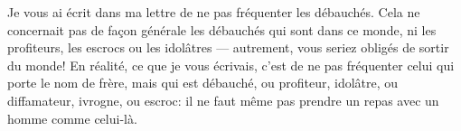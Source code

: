 Je vous ai écrit dans ma lettre de ne pas fréquenter les débauchés.
Cela ne concernait pas de façon générale les débauchés qui sont dans ce monde,
	ni les profiteurs, les escrocs ou les idolâtres
	--- autrement, vous seriez obligés de sortir du monde!
En réalité, ce que je vous écrivais,
	c’est de ne pas fréquenter celui qui porte le nom de frère,
	mais qui est débauché, ou profiteur,
	idolâtre, ou diffamateur, ivrogne, ou escroc:
	il ne faut même pas prendre un repas avec un homme comme celui-là.
